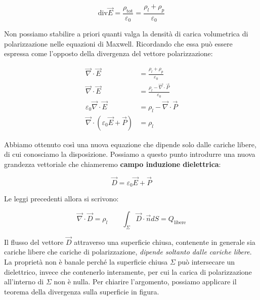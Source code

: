 \[
	\text{div}\vec{E} = \frac{\rho_{\text{tot}}}{\varepsilon_0}=\frac{\rho_l+\rho_p}{\varepsilon_0}
\]

Non possiamo stabilire a priori quanti valga la densità di carica volumetrica di polarizzazione nelle equazioni di Maxwell. Ricordando che essa può essere espressa come l'opposto della divergenza del vettore polarizzazione:

\begin{align*}
	\vec{\nabla} \cdot \vec{E} &= \frac{\rho_l+\rho_p}{\varepsilon_0} \\
	\vec{\nabla} \cdot \vec{E} &= \frac{\rho_l - \vec{\nabla} \cdot \vec{P}}{\varepsilon_0} \\
	\varepsilon_0 \vec{\nabla} \cdot \vec{E} &= \rho_l - \vec{\nabla} \cdot \vec{P} \\
	\vec{\nabla} \cdot (\varepsilon_0 \vec{E} + \vec{P} ) &= \rho_l
\end{align*}

Abbiamo ottenuto così una nuova equazione che dipende solo dalle cariche libere, di cui conosciamo la disposizione. Possiamo a questo punto introdurre una nuova grandezza vettoriale che chiameremo \textbf{campo induzione dielettrica}:

\[
	\boxed{\vec{D} = \varepsilon_0 \vec{E} + \vec{P}}
\]

Le leggi precedenti allora si scrivono:

\[
	\vec{\nabla} \cdot \vec{D} = \rho_l \qquad \int_{\Sigma}\vec{D} \cdot \vec{n} dS = Q_{\text{libere}}
\]

Il flusso del vettore $\vec{D}$ attraverso una superficie chiusa, contenente in generale sia cariche libere che cariche di polarizzazione, \emph{dipende soltanto dalle cariche libere}. La proprietà non è banale perché la superficie chiusa $\Sigma$ può intersecare un dielettrico, invece che contenerlo interamente, per cui la carica di polarizzazione all'interno di $\Sigma$ non è nulla. Per chiarire l'argomento, possiamo applicare il teorema della divergenza sulla superficie in figura.

